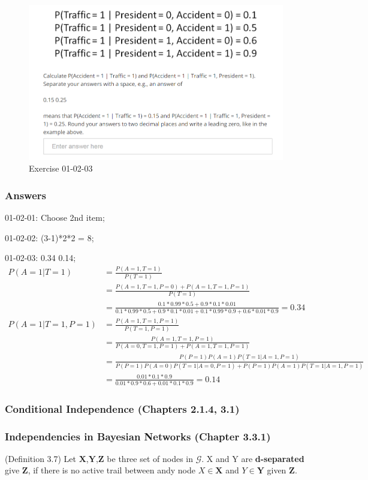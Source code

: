 \documentclass[12pt]{article}
\numberwithin{equation}{section}
\begin{document}
\begin{figure}[H]
	\includegraphics[width=\linewidth]{PGMpics/01-02-03-2.png}
	\caption{Exercise 01-02-03}
	\label{fig:01-02-03-2}
\end{figure}

\subsubsection{Answers}
01-02-01: Choose 2nd item;

01-02-02: (3-1)*2*2 = 8;

01-02-03: 0.34 0.14;
\begin{align*}
P(A=1|T=1)&=\frac{P(A=1,T=1)}{P(T=1)}
\\ &=\frac{P(A=1,T=1,P=0)+P(A=1,T=1,P=1)}{P(T=1)}
\\ &=\frac{0.1*0.99*0.5+0.9*0.1*0.01}{0.1*0.99*0.5+0.9*0.1*0.01+0.1*0.99*0.9+0.6*0.01*0.9}=0.34 \\
P(A=1|T=1,P=1)&=\frac{P(A=1,T=1,P=1)}{P(T=1,P=1)}
\\ &=\frac{P(A=1,T=1,P=1)}{P(A=0,T=1,P=1)+P(A=1,T=1,P=1)}
\\ &=\frac{P(P=1)P(A=1)P(T=1|A=1,P=1)}{P(P=1)P(A=0)P(T=1|A=0,P=1)+P(P=1)P(A=1)P(T=1|A=1,P=1)}
\\ &= \frac{0.01*0.1*0.9}{0.01*0.9*0.6+0.01*0.1*0.9} = 0.14
\end{align*}

\subsubsection{Conditional Independence (Chapters 2.1.4, 3.1)}
\subsubsection{Independencies in Bayesian Networks (Chapter 3.3.1)}
(Definition 3.7) Let $\mathbf{X}$,$\mathbf{Y}$,$\mathbf{Z}$ be three set of nodes in $\mathcal{G}$. X and Y are \textbf{d-separated} give $\mathbf{Z}$, if there is no active trail between andy node $X\in\mathbf{X}$ and $Y\in\mathbf{Y}$ given $\mathbf{Z}$.
\end{document}
